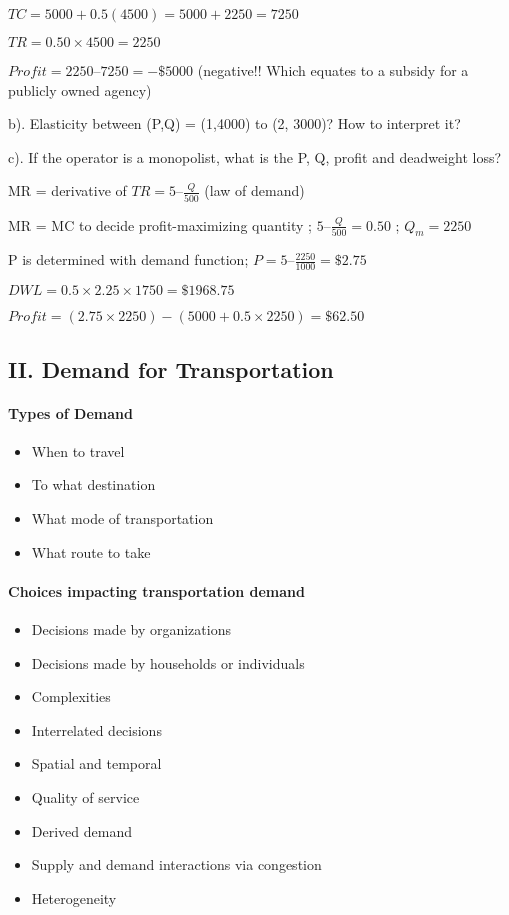 \documentclass[]{article}
\providecommand{\tightlist}{%
  \setlength{\itemsep}{0pt}\setlength{\parskip}{0pt}}
\let\oldparagraph\paragraph
\renewcommand{\paragraph}[1]{\oldparagraph{#1}\mbox{}}
\begin{document}
\(TC=5000+0.5(4500)=5000+2250=7250\)

\(TR=0.50\times 4500=2250\)

\(Profit=2250–7250=-\$5000\) (negative!! Which equates to a subsidy for
a publicly owned agency)

b). Elasticity between (P,Q) = (1,4000) to (2, 3000)? How to interpret
it?

c). If the operator is a monopolist, what is the P, Q, profit and
deadweight loss?

MR = derivative of \(TR=5–\frac{Q}{500}\) (law of demand)

MR = MC to decide profit-maximizing quantity ; \(5–\frac{Q}{500}=0.50\)
; \(Q_m=2250\)

P is determined with demand function;
\(P = 5 – \frac{2250}{1000} = \$2.75\)

\(DWL=0.5\times2.25\times1750=\$1968.75\)

\(Profit=(2.75\times2250)-(5000+0.5\times2250)=\$62.50\)

\hypertarget{ii.-demand-for-transportation}{%
\subsection{II. Demand for
Transportation}\label{ii.-demand-for-transportation}}

\hypertarget{types-of-demand}{%
\paragraph{Types of Demand}\label{types-of-demand}}

\begin{itemize}
\tightlist
\item
  When to travel
\item
  To what destination
\item
  What mode of transportation
\item
  What route to take
\end{itemize}

\hypertarget{choices-impacting-transportation-demand}{%
\paragraph{Choices impacting transportation
demand}\label{choices-impacting-transportation-demand}}

\begin{itemize}
\tightlist
\item
  Decisions made by organizations
\item
  Decisions made by households or individuals
\item
  Complexities
\item
  Interrelated decisions
\item
  Spatial and temporal
\item
  Quality of service
\item
  Derived demand
\item
  Supply and demand interactions via congestion
\item
  Heterogeneity
\end{itemize}
\end{document}
